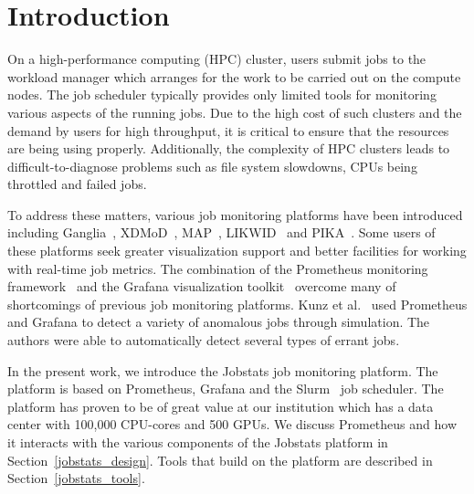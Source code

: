 \section{Introduction}
On a high-performance computing (HPC) cluster, users submit jobs to the workload manager which arranges for the work to be carried out on the compute nodes. The job scheduler typically provides only limited tools for monitoring various aspects of the running jobs. Due to the high cost of such clusters and the demand by users for high throughput, it is critical to ensure that the resources are being using properly. Additionally, the complexity of HPC clusters leads to difficult-to-diagnose problems such as file system slowdowns, CPUs being throttled and failed jobs.

To address these matters, various job monitoring platforms have been introduced including Ganglia~\cite{ganglia}, XDMoD~\cite{xdmod}, MAP~\cite{map_platform,map_platform2}, LIKWID~\cite{likwid} and PIKA~\cite{pika}. Some users of these platforms seek greater visualization support and better facilities for working with real-time job metrics. The combination of the Prometheus monitoring framework~\cite{prometheus} and the Grafana visualization toolkit~\cite{grafana} overcome many of shortcomings of previous job monitoring platforms. Kunz et al.~\cite{pascal} used Prometheus and Grafana to detect a variety of anomalous jobs through simulation. The authors were able to automatically detect several types of errant jobs.

In the present work, we introduce the Jobstats job monitoring platform. The platform is based on Prometheus, Grafana and the Slurm~\cite{slurm} job scheduler. The platform has proven to be of great value at our institution which has a data center with 100,000 CPU-cores and 500 GPUs. We discuss Prometheus and how it interacts with the various components of the Jobstats platform in Section~\ref{jobstats_design}. Tools that build on the platform are described in Section~\ref{jobstats_tools}.
